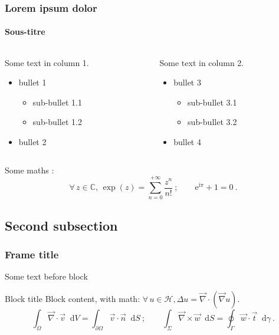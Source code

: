 \documentclass[t,10pt,aspectratio=169]{beamer}
\begin{document}
\begin{frame}
    \frametitle{Lorem ipsum dolor}
    \framesubtitle{Sous-titre}
\begin{columns}[t,onlytextwidth]
\begin{column}{.5\textwidth}
    Some text in column 1.
    \begin{itemize}
        \item bullet 1
            \begin{itemize}
                \item sub-bullet 1.1
                \item sub-bullet 1.2
            \end{itemize}
        \item bullet 2
    \end{itemize}
\end{column}\begin{column}{.5\textwidth}
    Some text in column 2.
    \begin{itemize}
        \item bullet 3
            \begin{itemize}
                \item sub-bullet 3.1
                \item sub-bullet 3.2
            \end{itemize}
        \item bullet 4
    \end{itemize}
\end{column}
\end{columns}
\vfill
Some maths :
%
\begin{equation}
\forall \, z \in \mathbb{C}, \, \exp(z) = \sum_{n=0}^{+\infty} \frac{z^n}{n!}~; \qquad%
 \mathrm{e}^{\mathrm{i}\pi} + 1 = 0~.
\end{equation}
%
\vspace*{\fill}
\end{frame}


\subsection[2nd subsection]{Second subsection}

\begin{frame}
\frametitle{Frame title}
Some text before block
\vfill
\begin{block}{Block title}
    Block content, with math:
    $\forall \, u \in \mathcal{H}\!, %
     \Delta u = \vec{\nabla}\!\cdot\! \left( \vec{\nabla} u \right)$.
    \begin{equation*}
        \int_{\Omega}\! \vec{\nabla}\!\cdot\! \vec{v}  \mathop{}\!\mathrm{d}V =
        \int_{\partial \Omega}\!\! \vec{v} \cdot \vec{n} \mathop{}\!\mathrm{d}S~; \qquad
        \int_{\Sigma}\! \vec{\nabla}\!\times\! \vec{w} \mathop{}\!\mathrm{d}S =
        \oint_{\Gamma}\! \vec{w} \cdot \vec{t} \mathop{}\!\mathrm{d}\gamma~.
    \end{equation*}
\end{block}

\end{frame}
\end{document}
